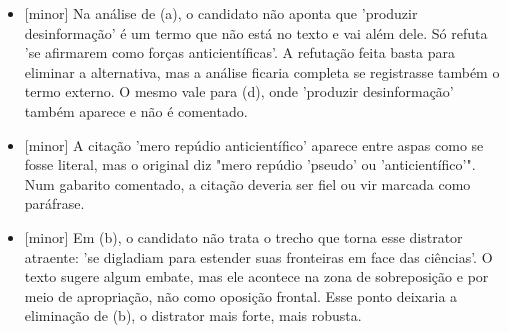 \documentclass{article}%
\begin{document}
\begin{itemize}%
\item%
{[}minor{]} Na análise de (a), o candidato não aponta que 'produzir desinformação' é um termo que não está no texto e vai além dele. Só refuta 'se afirmarem como forças anticientíficas'. A refutação feita basta para eliminar a alternativa, mas a análise ficaria completa se registrasse também o termo externo. O mesmo vale para (d), onde 'produzir desinformação' também aparece e não é comentado.%
\item%
{[}minor{]} A citação 'mero repúdio anticientífico' aparece entre aspas como se fosse literal, mas o original diz "mero repúdio 'pseudo' ou 'anticientífico'". Num gabarito comentado, a citação deveria ser fiel ou vir marcada como paráfrase.%
\item%
{[}minor{]} Em (b), o candidato não trata o trecho que torna esse distrator atraente: 'se digladiam para estender suas fronteiras em face das ciências'. O texto sugere algum embate, mas ele acontece na zona de sobreposição e por meio de apropriação, não como oposição frontal. Esse ponto deixaria a eliminação de (b), o distrator mais forte, mais robusta.%
\end{itemize}%
\end{document}
